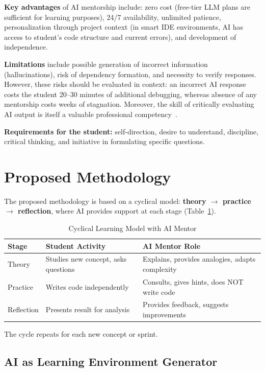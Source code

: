 \documentclass[conference,a4paper]{IEEEtran}
\begin{document}
\textbf{Key advantages} of AI mentorship include: zero cost (free-tier LLM plans are sufficient for learning purposes), 24/7 availability, unlimited patience, personalization through project context (in smart IDE environments, AI has access to student's code structure and current errors), and development of independence.

\textbf{Limitations} include possible generation of incorrect information (hallucinations), risk of dependency formation, and necessity to verify responses. However, these risks should be evaluated in context: an incorrect AI response costs the student 20--30 minutes of additional debugging, whereas absence of any mentorship costs weeks of stagnation. Moreover, the skill of critically evaluating AI output is itself a valuable professional competency~\cite{stackoverflow2025}.

\textbf{Requirements for the student:} self-direction, desire to understand, discipline, critical thinking, and initiative in formulating specific questions.

\section{Proposed Methodology}

The proposed methodology is based on a cyclical model: \textbf{theory $\rightarrow$ practice $\rightarrow$ reflection}, where AI provides support at each stage (Table~\ref{tab:cycle}).

\begin{table}[htbp]
\caption{Cyclical Learning Model with AI Mentor}
\label{tab:cycle}
\centering
\begin{tabular}{|p{1.2cm}|p{3cm}|p{3.5cm}|}
\hline
\textbf{Stage} & \textbf{Student Activity} & \textbf{AI Mentor Role} \\
\hline
Theory & Studies new concept, asks questions & Explains, provides analogies, adapts complexity \\
\hline
Practice & Writes code independently & Consults, gives hints, does NOT write code \\
\hline
Reflection & Presents result for analysis & Provides feedback, suggests improvements \\
\hline
\end{tabular}
\end{table}

The cycle repeats for each new concept or sprint.

\subsection{AI as Learning Environment Generator}
\end{document}
